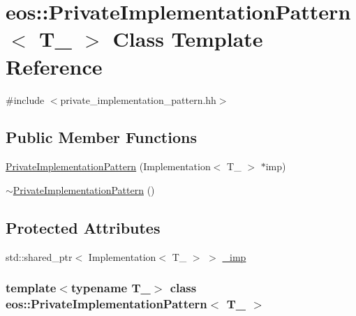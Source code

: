 \hypertarget{classeos_1_1PrivateImplementationPattern}{
\section{eos::PrivateImplementationPattern$<$ T\_\- $>$ Class Template Reference}
\label{classeos_1_1PrivateImplementationPattern}
}


{\ttfamily \#include $<$private\_\-implementation\_\-pattern.hh$>$}\subsection*{Public Member Functions}
\begin{DoxyCompactItemize}
\item 
\hyperlink{classeos_1_1PrivateImplementationPattern_a3e3d5f4a565256a1dda6c234b051b2f2}{PrivateImplementationPattern} (Implementation$<$ T\_\- $>$ $\ast$imp)
\item 
\hyperlink{classeos_1_1PrivateImplementationPattern_acf46ec2739c3b0ec9702b9428475876d}{$\sim$PrivateImplementationPattern} ()
\end{DoxyCompactItemize}
\subsection*{Protected Attributes}
\begin{DoxyCompactItemize}
\item 
std::shared\_\-ptr$<$ Implementation$<$ T\_\- $>$ $>$ \hyperlink{classeos_1_1PrivateImplementationPattern_a232940e78b26c6ed4f97196f831c69c9}{\_\-imp}
\end{DoxyCompactItemize}
\subsubsection*{template$<$typename T\_\-$>$ class eos::PrivateImplementationPattern$<$ T\_\- $>$}



